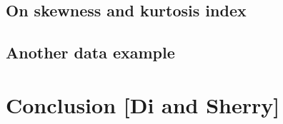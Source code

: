 \documentclass[
  number,
  preprint,
  3p]{elsarticle}
\begin{document}
\subsection{On skewness and kurtosis
index}\label{on-skewness-and-kurtosis-index}

\subsection{Another data example}\label{another-data-example}

\section{Conclusion {[}Di and Sherry{]}}\label{sec-conclusion}


\renewcommand\refname{References}
  
\end{document}
